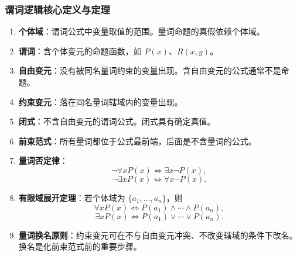 \subsubsection{谓词逻辑核心定义与定理}

\begin{enumerate}
	\item \textbf{个体域}：谓词公式中变量取值的范围。量词命题的真假依赖个体域。
	\item \textbf{谓词}：含个体变元的命题函数，如 \(P(x)\)、\(R(x,y)\)。
	\item \textbf{自由变元}：没有被同名量词约束的变量出现。含自由变元的公式通常不是命题。
	\item \textbf{约束变元}：落在同名量词辖域内的变量出现。
	\item \textbf{闭式}：不含自由变元的谓词公式。闭式具有确定真值。
	\item \textbf{前束范式}：所有量词都位于公式最前端，后面是不含量词的公式。
	\item \textbf{量词否定律}：
	\[
	\neg\forall xP(x)\Leftrightarrow\exists x\neg P(x),
	\]
	\[
	\neg\exists xP(x)\Leftrightarrow\forall x\neg P(x).
	\]
	\item \textbf{有限域展开定理}：若个体域为 \(\{a_1,\dots,a_n\}\)，则
	\[
	\forall xP(x)\Leftrightarrow P(a_1)\land\cdots\land P(a_n),
	\]
	\[
	\exists xP(x)\Leftrightarrow P(a_1)\lor\cdots\lor P(a_n).
	\]
	\item \textbf{量词换名原则}：约束变元可在不与自由变元冲突、不改变辖域的条件下改名。换名是化前束范式前的重要步骤。
\end{enumerate}

